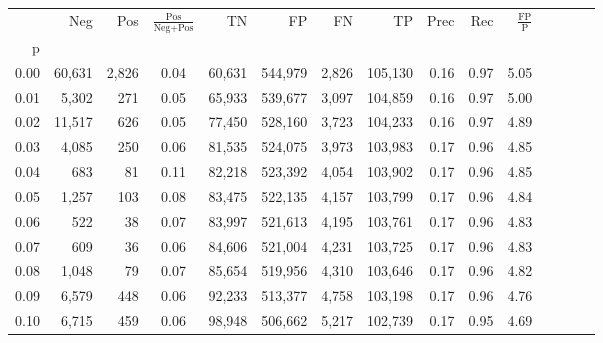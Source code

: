 \begin{tabular}{rrrcrrrrrrrrrrr}
\toprule
{} &     Neg &     Pos & $\frac{\text{Pos}}{\text{Neg}+\text{Pos}}$ &       TN &       FP &       FN &       TP &  Prec &   Rec & $\frac{\text{FP}}{\text{P}}$ \\
p    &         &         &                                            &          &          &          &          &       &       &                              \\
\midrule
0.00 &  60,631 &   2,826 &                                       0.04 &   60,631 &  544,979 &    2,826 &  105,130 &  0.16 &  0.97 &                         5.05 \\
0.01 &   5,302 &     271 &                                       0.05 &   65,933 &  539,677 &    3,097 &  104,859 &  0.16 &  0.97 &                         5.00 \\
0.02 &  11,517 &     626 &                                       0.05 &   77,450 &  528,160 &    3,723 &  104,233 &  0.16 &  0.97 &                         4.89 \\
0.03 &   4,085 &     250 &                                       0.06 &   81,535 &  524,075 &    3,973 &  103,983 &  0.17 &  0.96 &                         4.85 \\
0.04 &     683 &      81 &                                       0.11 &   82,218 &  523,392 &    4,054 &  103,902 &  0.17 &  0.96 &                         4.85 \\
0.05 &   1,257 &     103 &                                       0.08 &   83,475 &  522,135 &    4,157 &  103,799 &  0.17 &  0.96 &                         4.84 \\
0.06 &     522 &      38 &                                       0.07 &   83,997 &  521,613 &    4,195 &  103,761 &  0.17 &  0.96 &                         4.83 \\
0.07 &     609 &      36 &                                       0.06 &   84,606 &  521,004 &    4,231 &  103,725 &  0.17 &  0.96 &                         4.83 \\
0.08 &   1,048 &      79 &                                       0.07 &   85,654 &  519,956 &    4,310 &  103,646 &  0.17 &  0.96 &                         4.82 \\
0.09 &   6,579 &     448 &                                       0.06 &   92,233 &  513,377 &    4,758 &  103,198 &  0.17 &  0.96 &                         4.76 \\
0.10 &   6,715 &     459 &                                       0.06 &   98,948 &  506,662 &    5,217 &  102,739 &  0.17 &  0.95 &                         4.69 \\

\end{tabular}
